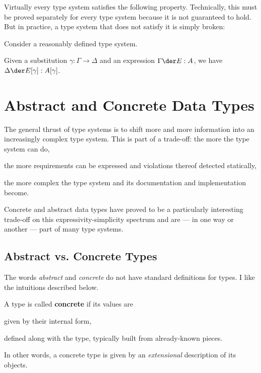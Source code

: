 Virtually every type system satisfies the following property.
Technically, this must be proved separately for every type system because it is not guaranteed to hold.
But in practice, a type system that does not satisfy it is simply broken:

\begin{theorem}
Consider a reasonably defined type system.

Given a substitution $\gamma:\Gamma\to \Delta$ and an expression $\Gamma \der E:A$, we have $\Delta\der E[\gamma]:A[\gamma]$.
\end{theorem}


\section{Abstract and Concrete Data Types}

The general thrust of type systems is to shift more and more information into an increasingly complex type system.
This is part of a trade-off: the more the type system can do,
\begin{compactitem}
 \item the more requirements can be expressed and violations thereof detected statically,
 \item the more complex the type system and its documentation and implementation become.
\end{compactitem}

Concrete and abstract data types have proved to be a particularly interesting trade-off on this expressivity-simplicity spectrum and are --- in one way or another --- part of many type systems.

\subsection{Abstract vs. Concrete Types}

The words \emph{abstract} and \emph{concrete} do not have standard definitions for types.
I like the intuitions described below.

A type is called \textbf{concrete} if its values are
\begin{compactitem}
\item given by their internal form,
\item defined along with the type, typically built from already-known pieces.
\end{compactitem}
In other words, a concrete type is given by an \emph{extensional} description of its objects.

